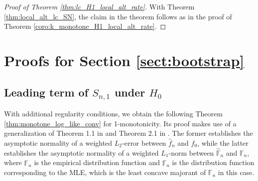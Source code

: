 \documentclass[12pt,letterpaper, twoside, openany]{article}
\theoremstyle{plain}
\begin{document}
\begin{proof}[Proof of Theorem \ref{thm:lc_H1_local_alt_rate}]
  With Theorem \ref{thm:local_alt_lc_SN}, the claim in the theorem follows as in the proof of Theorem \ref{coro:k_monotone_H1_local_alt_rate}.
\end{proof}


\section{Proofs for Section \ref{sect:bootstrap}}

\subsection{Leading term of $S_{n,1}$ under $H_0$}

With additional regularity conditions, we obtain the following Theorem \ref{thm:monotone_log_like_conv} for 1-monotonicity. Its proof makes use of a generalization of Theorem 1.1 in \cite{Kulikov2005} and Theorem 2.1 in \cite{Kulikov2008}. The former establishes the asymptotic normality of a  weighted $L_2$-error between $\hat{f}_n$ and $f_0$, while  the latter establishes the asymptotic normality of a weighted $L_1$-norm between $\hat{\mathbb{F}}_n$ and $\mathbb{F}_n$, where $\mathbb{F}_n$ is the empirical distribution function and $\hat{\mathbb{F}}_n$ is the distribution function corresponding to the MLE, which is the least concave majorant of $\mathbb{F}_n$ in this case.

\end{document}
